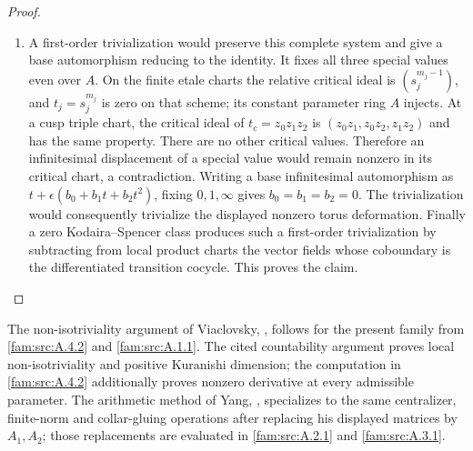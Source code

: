 \begin{proof}
\begin{enumerate}[label=\arabic*.,leftmargin=*]
\item A first-order trivialization would preserve this complete system and give a base automorphism reducing to the identity. It fixes all three special values even over $A$. On the finite etale charts the relative critical ideal is $(s_j^{m_j-1})$, and $t_j=s_j^{m_j}$ is zero on that scheme; its constant parameter ring $A$ injects. At a cusp triple chart, the critical ideal of $t_c=z_0z_1z_2$ is $(z_0z_1,z_0z_2,z_1z_2)$ and has the same property. There are no other critical values. Therefore an infinitesimal displacement of a special value would remain nonzero in its critical chart, a contradiction. Writing a base infinitesimal automorphism as $t+\epsilon(b_0+b_1t+b_2t^2)$, fixing $0,1,\infty$ gives $b_0=b_1=b_2=0$. The trivialization would consequently trivialize the displayed nonzero torus deformation. Finally a zero Kodaira--Spencer class produces such a first-order trivialization by subtracting from local product charts the vector fields whose coboundary is the differentiated transition cocycle. This proves the claim.
\end{enumerate}
\end{proof}

\begin{proposition}\label{fam:src:A.4.3}\label{fam:st:A.4.3}

The non-isotriviality argument of Viaclovsky, \cite[Proposition 4.7]{ViaclovskyLog2026}, follows for the present family from \ref{fam:src:A.4.2} and \ref{fam:src:A.1.1}. The cited countability argument proves local non-isotriviality and positive Kuranishi dimension; the computation in \ref{fam:src:A.4.2} additionally proves nonzero derivative at every admissible parameter. The arithmetic method of Yang, \cite[Lemmas 6.6--6.9 and Proposition 6.15]{Yang2026}, specializes to the same centralizer, finite-norm and collar-gluing operations after replacing his displayed matrices by $A_1,A_2$; those replacements are evaluated in \ref{fam:src:A.2.1} and \ref{fam:src:A.3.1}.
\end{proposition}


